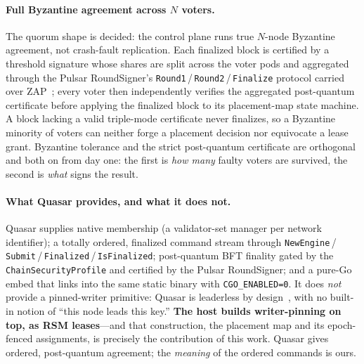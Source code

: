 \documentclass[11pt]{article}
\begin{document}
\paragraph{Full Byzantine agreement across $N$ voters.}
The quorum shape is decided: the control plane runs true $N$-node Byzantine
agreement, not crash-fault replication. Each finalized block is certified by a
threshold signature whose shares are split across the voter pods and
aggregated through the Pulsar RoundSigner's
\texttt{Round1}\,/\,\texttt{Round2}\,/\,\texttt{Finalize} protocol carried over
ZAP~\cite{hip0114}; every voter then independently verifies the aggregated
post-quantum certificate before applying the finalized block to its
placement-map state machine. A block lacking a valid triple-mode certificate
never finalizes, so a Byzantine minority of voters can neither forge a
placement decision nor equivocate a lease grant. Byzantine tolerance and the
strict post-quantum certificate are orthogonal and both on from day one: the
first is \emph{how many} faulty voters are survived, the second is \emph{what}
signs the result.

\paragraph{What Quasar provides, and what it does not.}
Quasar supplies native membership (a validator-set manager per network
identifier); a totally ordered, finalized command stream through
\texttt{NewEngine}\,/\,\texttt{Submit}\,/\,\texttt{Finalized}\,/\,\texttt{IsFinalized};
post-quantum BFT finality gated by the \texttt{ChainSecurityProfile} and
certified by the Pulsar RoundSigner; and a pure-Go embed that links into the
same static binary with \texttt{CGO\_ENABLED=0}. It does \emph{not} provide a
pinned-writer primitive: Quasar is
leaderless by design~\cite{avalanche}, with no built-in notion of ``this node
leads this key.'' \textbf{The host builds writer-pinning on top, as RSM
leases}---and that construction, the placement map and its epoch-fenced
assignments, is precisely the contribution of this work. Quasar gives
ordered, post-quantum agreement; the \emph{meaning} of the ordered commands
is ours.
\end{document}

